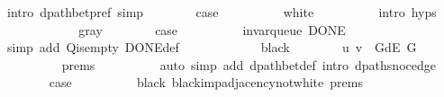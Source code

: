 \begin{isabellebody}
\ {\isacharparenleft}{\kern0pt}intro\ dpath{\isacharunderscore}{\kern0pt}bet{\isacharunderscore}{\kern0pt}pref{\isacharparenright}{\kern0pt}\ simp\isanewline
\ \ \ \ \ \ \isamarkupfalse%
\ {\isacharquery}{\kern0pt}case\isanewline
\ \ \ \ \ \ \ \ \isamarkupfalse%
\ white\isanewline
\ \ \ \ \ \ \ \ \isamarkupfalse%
\ {\isacharparenleft}{\kern0pt}intro\ {\isachardoublequoteopen}{}{\isachardot}{\kern0pt}hyps{\isachardoublequoteclose}{\isacharparenright}{\kern0pt}\isanewline
\ \ \ \ \isamarkupfalse%
\isanewline
\ \ \ \ \ \ \isamarkupfalse%
\ gray\isanewline
\ \ \ \ \ \ \isamarkupfalse%
\ {\isacharquery}{\kern0pt}case\isanewline
\ \ \ \ \ \ \ \ \isamarkupfalse%
\ invar{\isacharunderscore}{\kern0pt}queue\ DONE\isanewline
\ \ \ \ \ \ \ \ \isamarkupfalse%
\ {\isacharparenleft}{\kern0pt}simp\ add{\isacharcolon}{\kern0pt}\ Q{\isachardot}{\kern0pt}is{\isacharunderscore}{\kern0pt}empty\ DONE{\isacharunderscore}{\kern0pt}def{\isacharparenright}{\kern0pt}\isanewline
\ \ \ \ \isamarkupfalse%
\isanewline
\ \ \ \ \ \ \isamarkupfalse%
\ black\isanewline
\ \ \ \ \ \ \isamarkupfalse%
\ {\isachardoublequoteopen}{\isacharparenleft}{\kern0pt}u{\isacharcomma}{\kern0pt}\ v{\isacharparenright}{\kern0pt}\ {\isasymin}\ G{\isachardot}{\kern0pt}dE\ G{\isachardoublequoteclose}\isanewline
\ \ \ \ \ \ \ \ \isamarkupfalse%
\ {\isachardoublequoteopen}{}{\isachardot}{\kern0pt}prems{\isachardoublequoteclose}{\isacharparenleft}{\kern0pt}{}{\isacharparenright}{\kern0pt}\isanewline
\ \ \ \ \ \ \ \ \isamarkupfalse%
\ {\isacharparenleft}{\kern0pt}auto\ simp\ add{\isacharcolon}{\kern0pt}\ dpath{\isacharunderscore}{\kern0pt}bet{\isacharunderscore}{\kern0pt}def\ intro{\isacharcolon}{\kern0pt}\ dpath{\isacharunderscore}{\kern0pt}snoc{\isacharunderscore}{\kern0pt}edge{\isacharunderscore}{\kern0pt}{}{\isacharparenright}{\kern0pt}\isanewline
\ \ \ \ \ \ \isamarkupfalse%
\ {\isacharquery}{\kern0pt}case\isanewline
\ \ \ \ \ \ \ \ \isamarkupfalse%
\ black\ black{\isacharunderscore}{\kern0pt}imp{\isacharunderscore}{\kern0pt}adjacency{\isacharunderscore}{\kern0pt}not{\isacharunderscore}{\kern0pt}white\ {\isachardoublequoteopen}{}{\isachardot}{\kern0pt}prems{\isachardoublequoteclose}{\isacharparenleft}{\kern0pt}{}{\isacharparenright}{\kern0pt}\isanewline
\ \ \ \ \ \ \ \ \isamarkupfalse%

\end{isabellebody}
